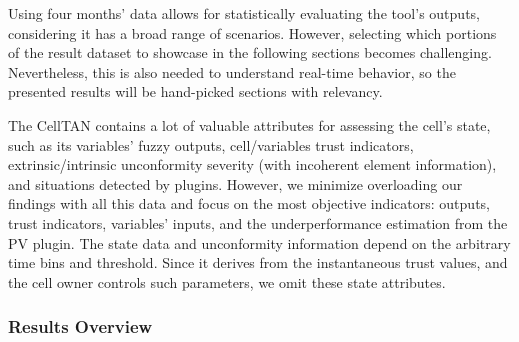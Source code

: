 Using four months' data allows for statistically evaluating the tool's outputs, considering it has a broad range of scenarios. However, selecting which portions of the result dataset to showcase in the following sections becomes challenging. Nevertheless, this is also needed to understand real-time behavior, so the presented results will be hand-picked sections with relevancy.

The CellTAN contains a lot of valuable attributes for assessing the cell's state, such as its variables' fuzzy outputs, cell/variables trust indicators, extrinsic/intrinsic unconformity severity (with incoherent element information), and situations detected by plugins. However, we minimize overloading our findings with all this data and focus on the most objective indicators: outputs, trust indicators, variables' inputs, and the underperformance estimation from the PV plugin. The state data and unconformity information depend on the arbitrary time bins and threshold. Since it derives from the instantaneous trust values, and the cell owner controls such parameters, we omit these state attributes.

\subsubsection{Results Overview}







